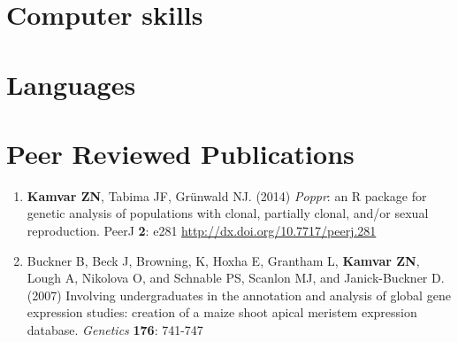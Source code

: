 \documentclass[10pt,letterpaper,sans]{modernresume} %
\begin{document}

\section{Computer skills}




\section{Languages}




\section{Peer Reviewed Publications}

\begin{enumerate}

    \item \textbf{Kamvar ZN}, Tabima JF, Gr\"unwald NJ. (2014) \textit{Poppr}: an
	R package for genetic analysis of populations with clonal, partially clonal,
	and/or sexual reproduction. PeerJ \textbf{2}: e281
	\url{http://dx.doi.org/10.7717/peerj.281}

	\item Buckner B, Beck J, Browning, K, Hoxha E, Grantham L, \textbf{Kamvar ZN}, Lough A,
	Nikolova O, and Schnable PS, Scanlon MJ, and Janick-Buckner D. (2007) Involving
	undergraduates in the annotation and analysis of global gene expression studies:
	creation of a maize shoot apical meristem expression database. \textit{Genetics}
	\textbf{176}: 741-747

\end{enumerate}
\end{document}
